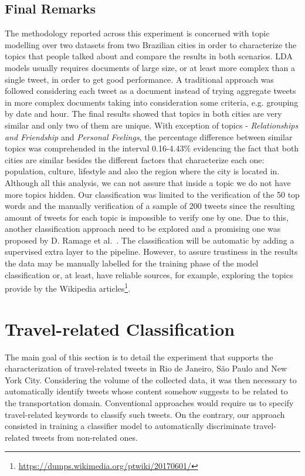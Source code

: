 \subsection{Final Remarks}
The methodology reported across this experiment is concerned with topic modelling over two datasets from two Brazilian cities in order to characterize the topics that people talked about and compare the results in both scenarios. LDA models usually requires documents of large size, or at least more complex than a single tweet, in order to get good performance. A traditional approach was followed considering each tweet as a document instead of trying aggregate tweets in more complex documents taking into consideration some criteria, e.g. grouping by date and hour. The final results showed that topics in both cities are very similar and only two of them are unique. With exception of topics - \textit{Relationships and Friendship} and \textit{Personal Feelings}, the percentage difference between similar topics was comprehended in the interval 0.16-4.43\% evidencing the fact that both cities are similar besides the different factors that characterize each one: population, culture, lifestyle and also the region where the city is located in. Although all this analysis, we can not assure that inside a topic we do not have more topics hidden. Our classification was limited to the verification of the 50 top words and the manually verification of a sample of 200 tweets since the resulting amount of tweets for each topic is impossible to verify one by one. Due to this, another classification approach need to be explored and a promising one was proposed by D. Ramage et al.~\cite{ramage2010characterizing}. The classification will be automatic by adding a supervised extra layer to the pipeline. However, to assure trustiness in the results the data may be manually labelled for the training phase of the model classification or, at least, have reliable sources, for example, exploring the topics provide by the Wikipedia articles\footnote{\url{https://dumps.wikimedia.org/ptwiki/20170601/}}.

\section{Travel-related Classification}\label{sec:travel_related_classification}
The main goal of this section is to detail the experiment that supports the characterization of travel-related tweets in Rio de Janeiro, São Paulo and New York City. Considering the volume of the collected data, it was then necessary to automatically identify tweets whose content somehow suggests to be related to the transportation domain. Conventional approaches would require us to specify travel-related keywords to classify such tweets. On the contrary, our approach consisted in training a classifier model to automatically discriminate travel-related tweets from non-related ones. 

